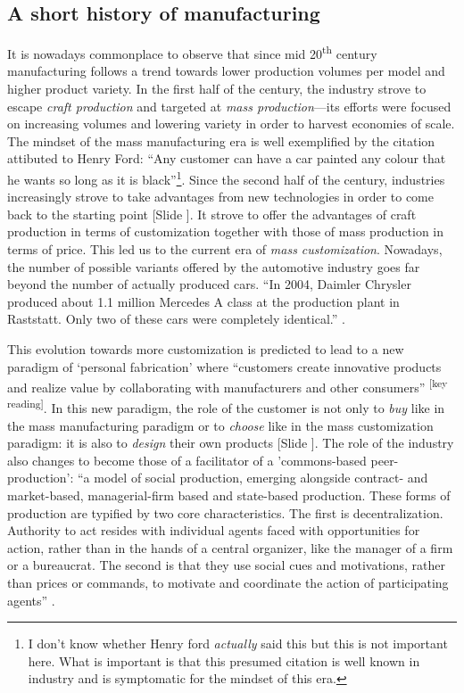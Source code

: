 \documentclass{article}
\newcounter{slide}
\begin{document}
\subsection{A short history of manufacturing}
\label{sec:history}
It is nowadays commonplace to observe that since mid 20\textsuperscript{th} century manufacturing follows a trend towards lower production volumes per model and higher product variety. In the first half of the century, the industry strove to escape \emph{craft production} and targeted at \emph{mass production}---its efforts were focused on increasing volumes and lowering variety in order to harvest economies of scale. The mindset of the mass manufacturing era is well exemplified by the citation attibuted to Henry Ford: ``Any customer can have a car painted any colour that he wants so long as it is black''\footnote{I don't know whether Henry ford \emph{actually} said this but this is not important here. What is important is that this presumed citation is well known in industry and is symptomatic for the mindset of this era.}. Since the second half of the century, industries increasingly strove to take advantages from new technologies in order to come back to the starting point {\color{blue}[Slide ]}. It strove to offer the advantages of craft production in terms of customization together with those of mass production in terms of price. This led us to the current era of \emph{mass customization}. Nowadays, the number of possible variants offered by the automotive industry goes far beyond the number of actually produced cars. ``In 2004, Daimler Chrysler produced about 1.1 million Mercedes A class at the production plant in Raststatt. Only two of these cars were completely identical.'' \cite{piller2010handbook}.

This evolution towards more customization is predicted to lead to a new paradigm of `personal fabrication' where ``customers create innovative products and realize value by collaborating with manufacturers and other consumers'' \cite{huEvolvingParadigmsManufacturing2013a}\textsuperscript{\color{Magenta}[key reading]}. In this new paradigm, the role of the customer is not only to \emph{buy} like in the mass manufacturing paradigm or to \emph{choose} like in the mass customization paradigm: it is also to \emph{design} their own products {\color{blue}[Slide ]}. The role of the industry also changes to become those of a facilitator of a 'commons-based peer-production': ``a model of social production, emerging alongside contract- and market-based, managerial-firm based and state-based production. These forms of production are typified by two core characteristics. The first is decentralization. Authority to act resides with individual agents faced with opportunities for action, rather than in the hands of a central organizer, like the manager of a firm or a bureaucrat. The second is that they use social cues and motivations, rather than prices or commands, to motivate and coordinate the action of participating agents'' \cite{benklerCommonsbasedPeerProduction2006}. 
\end{document}
